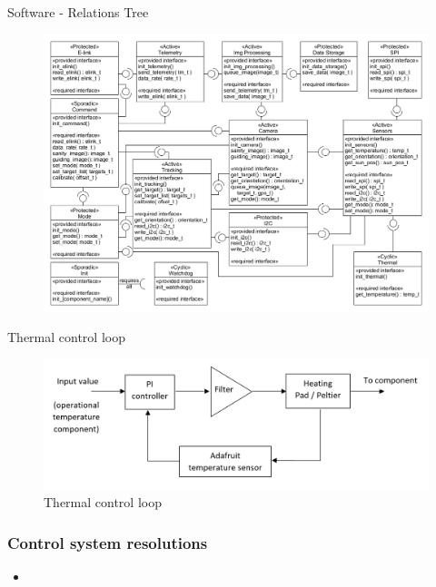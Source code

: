 \documentclass[11pt, aspectratio=169]{beamer}
\begin{document}
\begin{frame}[c]{Software - Relations Tree}
    \begin{figure}
        \includegraphics[height=.9\textheight]{software/complete_relations_tree.png}
    \end{figure}
\end{frame}

\begin{frame}[c]{Thermal control loop}
    \begin{figure}
        \includegraphics[width=\textwidth]{figures/images/thermalcontrol.png}
        \caption*{Thermal control loop}
    \end{figure}
\end{frame}

\begin{frame}
    \frametitle{Control system resolutions}
    \begin{itemize}
        \item 
    \end{itemize}
\end{frame}
\end{document}
